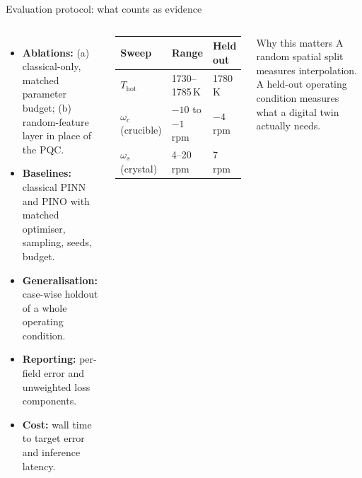 \documentclass[aspectratio=169]{beamer}
\begin{document}
\begin{frame}{Evaluation protocol: what counts as evidence}
\begin{columns}[T,onlytextwidth]
\begin{itemize}\small
  \item \textbf{Ablations:} (a) classical-only, matched parameter budget; (b) random-feature layer in place of the PQC.
  \item \textbf{Baselines:} classical PINN and PINO with matched optimiser, sampling, seeds, budget.
  \item \textbf{Generalisation:} case-wise holdout of a whole operating condition.
  \item \textbf{Reporting:} per-field error and unweighted loss components.
  \item \textbf{Cost:} wall time to target error and inference latency.
\end{itemize}
\begin{center}
\small
\begin{tabular}{lll}
\toprule
Sweep & Range & Held out \\
\midrule
$T_{\mathrm{hot}}$ & 1730--1785\,K & 1780\,K \\
$\omega_c$ (crucible) & $-10$ to $-1$ rpm & $-4$ rpm \\
$\omega_s$ (crystal) & 4--20 rpm & 7 rpm \\
\bottomrule
\end{tabular}
\end{center}
\vspace{0.2cm}
\begin{block}{Why this matters}
\footnotesize A random spatial split measures interpolation. A held-out operating condition measures what a digital twin actually needs.
\end{block}
\end{columns}
\end{frame}
\end{document}
